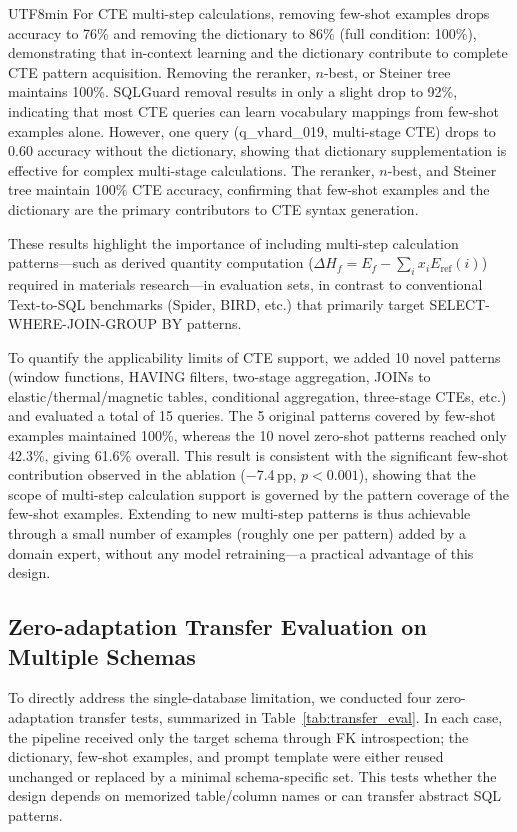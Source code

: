 \documentclass[sn-mathphys,Numbered]{sn-jnl}
\begin{document}
\begin{CJK}{UTF8}{min}
For CTE multi-step calculations, removing few-shot examples drops
accuracy to 76\% and removing the dictionary to 86\% (full
condition: 100\%), demonstrating that in-context learning and the
dictionary contribute to complete CTE pattern acquisition.
Removing the reranker, $n$-best, or Steiner tree maintains 100\%.
SQLGuard removal results in only a slight drop to 92\%, indicating
that most CTE queries can learn vocabulary mappings from few-shot
examples alone.
However, one query (q\_vhard\_019, multi-stage CTE) drops to 0.60
accuracy without the dictionary, showing that dictionary
supplementation is effective for complex multi-stage calculations.
The reranker, $n$-best, and Steiner tree maintain 100\% CTE
accuracy, confirming that few-shot examples and the dictionary are
the primary contributors to CTE syntax generation.

These results highlight the importance of including multi-step
calculation patterns---such as derived quantity computation
($\Delta H_f = E_f - \sum_i x_i E_{\mathrm{ref}}(i)$) required
in materials research---in evaluation sets, in contrast to
conventional Text-to-SQL benchmarks (Spider, BIRD, etc.) that
primarily target SELECT-WHERE-JOIN-GROUP BY patterns.

To quantify the applicability limits of CTE support, we added
10 novel patterns (window functions, HAVING filters, two-stage
aggregation, JOINs to elastic/thermal/magnetic tables, conditional
aggregation, three-stage CTEs, etc.) and evaluated a total of
15 queries.
The 5 original patterns covered by few-shot examples maintained
100\%, whereas the 10 novel zero-shot patterns reached only
42.3\%, giving 61.6\% overall.
This result is consistent with the significant few-shot
contribution observed in the ablation ($-$7.4\,pp, $p<0.001$),
showing that the scope of multi-step calculation support is
governed by the pattern coverage of the few-shot examples.
Extending to new multi-step patterns is thus achievable through a
small number of examples (roughly one per pattern) added by a
domain expert, without any model retraining---a practical
advantage of this design.

\subsection{Zero-adaptation Transfer Evaluation on Multiple Schemas}
\label{sec:transfer_eval}

To directly address the single-database limitation, we conducted
four zero-adaptation transfer tests, summarized in
Table~\ref{tab:transfer_eval}. In each case, the pipeline received
only the target schema through FK introspection; the dictionary,
few-shot examples, and prompt template were either reused unchanged
or replaced by a minimal schema-specific set. This tests whether the
design depends on memorized table/column names or can transfer
abstract SQL patterns.


\end{CJK}
\end{document}
